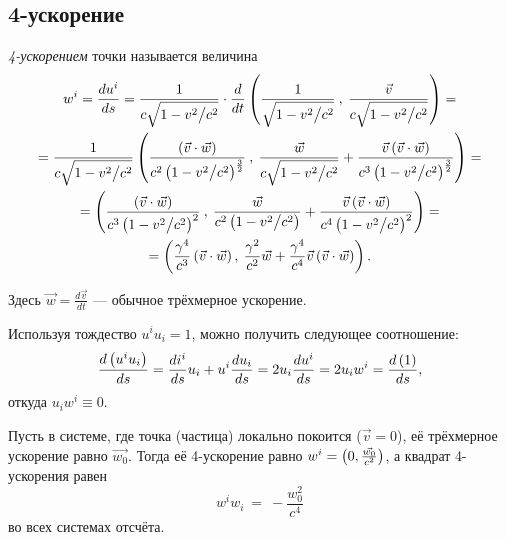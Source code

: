 \subsection{4-ускорение}
    \begin{Def}
        \textit{4-ускорением} точки называется величина
        \begin{gather*}
            w^i = \frac{du^i}{ds} = \frac{1}{c\sqrt{1 - v^2 \big/ c^2}} \cdot \frac{d}{dt} \left({\frac{1}{\sqrt{1 - v^2 \big/ c^2}} \:,\: \frac{\vec{v}}{c\sqrt{1 - v^2 \big/ c^2}}}\right) = \\
            = \frac{1}{c\sqrt{1 - v^2 \big/ c^2}}\left({\frac{\left({\vec{v}\cdot\vec{w}}\right)}{c^2\left({1-v^2 \big/ c^2}\right)^{\frac{3}{2}}} \:,\:
                \frac{\vec{w}}{c\sqrt{1 - v^2 \big/ c^2}} + \frac{\vec{v} \left({\vec{v} \cdot \vec{w}}\right)}{c^3 \left({1 - v^2 \big/ c^2}\right)^{\frac{3}{2}}}}\right) = \\
            = \left({\frac{\left({\vec{v} \cdot \vec{w}}\right)}{c^3 \left({1 - v^2 \big/ c^2}\right)^{2}} \:,\:
                \frac{\vec{w}}{c^2 \left({1 - v^2 \big/ c^2}\right)} + \frac{\vec{v} \left({\vec{v} \cdot \vec{w}}\right)}{c^4 \left({1 - v^2 \big/ c^2}\right)^2}}\right) = \\ =
            \left({\frac{\gamma^4}{c^3}\left({\vec{v}\cdot\vec{w}}\right),\: \frac{\gamma^2}{c^2}\vec{w} + \frac{\gamma^4}{c^4}\vec{v}\left({\vec{v}\cdot\vec{w}}\right)}\right).
        \end{gather*}
    \end{Def}
    Здесь $\vec{w} = \frac{d\vec{v}}{dt}$ --- обычное трёхмерное ускорение.

    Используя тождество $u^iu_i = 1$, можно получить следующее соотношение:
    \[
        \frac{d\left({u^iu_i}\right)}{ds} = \frac{di^i}{ds}u_i + u^i\frac{du_i}{ds} = 2u_i\frac{du^i}{ds}= 2u_iw^i = \frac{d\left({1}\right)}{ds},
    \]
    откуда $u_i w^i \equiv 0$.

    \begin{note}
        Пусть в системе, где точка (частица) локально покоится ($\vec{v} = 0$), её трёхмерное ускорение равно $\vec{w_0}$.
        Тогда её 4-ускорение равно $w^i = \left({0, \frac{\vec{w_0}}{c^2}}\right)$, а квадрат 4-ускорения равен
        \begin{equation}
            w^iw_i~=~-\frac{w_0^2}{c^4} \label{four_acc_feature}
        \end{equation}
        во всех системах отсчёта.
    \end{note}